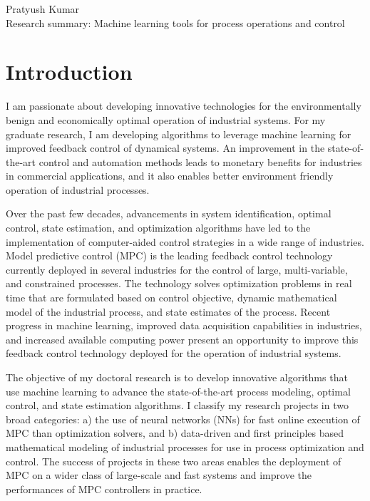 \documentclass[11pt, a4paper]{article} %
\begin{document}
\noindent \large{Pratyush Kumar}
\vspace{0.1in} \\
Research summary: Machine learning tools for process operations and control
\normalsize	

\vspace{0.1in}
\section*{Introduction}

I am passionate about developing innovative technologies for the environmentally benign and economically optimal operation of industrial systems. For my graduate research, I am developing algorithms to leverage machine learning for improved feedback control of dynamical systems. An improvement in the state-of-the-art control and automation methods leads to monetary benefits for industries in commercial applications, and it also enables better environment friendly operation of industrial processes.

Over the past few decades, advancements in system identification, optimal control, state estimation, and optimization algorithms have led to the implementation of computer-aided control strategies in a wide range of industries. Model predictive control (MPC) is the leading feedback control technology currently deployed in several industries for the control of large, multi-variable, and constrained processes. The technology solves optimization problems in real time that are formulated based on control objective, dynamic mathematical model of the industrial process, and state estimates of the process. Recent progress in machine learning, improved data acquisition capabilities in industries, and increased available computing power present an opportunity to improve this feedback control technology deployed for the operation of industrial systems.

The objective of my doctoral research is to develop innovative algorithms that use machine learning to advance the state-of-the-art process modeling, optimal control, and state estimation algorithms. I classify my research projects in two broad categories: a) the use of neural networks (NNs) for fast online execution of MPC than optimization solvers, and b) data-driven and first principles based mathematical modeling of industrial processes for use in process optimization and control. The success of projects in these two areas enables the deployment of MPC on a wider class of large-scale and fast systems and improve the performances of MPC controllers in practice. 
\end{document}
